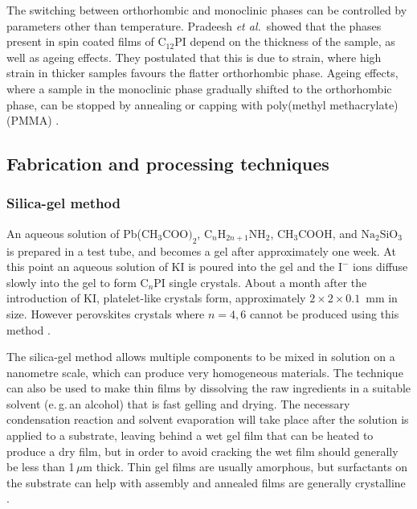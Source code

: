 The switching between orthorhombic and monoclinic phases can be controlled by parameters other than temperature. Pradeesh \textit{et al.}\ showed that the phases present in spin coated films of $\textrm{C}_{12}$PI depend on the thickness of the sample, as well as ageing effects. They postulated that this is due to strain, where high strain in thicker samples favours the flatter orthorhombic phase. Ageing effects, where a sample in the monoclinic phase gradually shifted to the orthorhombic phase, can be stopped by annealing or capping with poly(methyl methacrylate) (PMMA) \cite{Pradeesh2009}.

\subsection{Fabrication and processing techniques}
\subsubsection{Silica-gel method}
An aqueous solution of Pb($\textrm{CH}_3 \textrm{COO)}_2$, $\textrm{C}_n\textrm{H}_{2n+1}\textrm{NH}_2$, $\textrm{CH}_3$COOH, and $\textrm{Na}_2\textrm{SiO}_3$ is prepared in a test tube, and becomes a gel after approximately one week. At this point an aqueous solution of KI is poured into the gel and the $\textrm{I}^-$ ions diffuse slowly into the gel to form $\textrm{C}_n$PI single crystals. About a month after the introduction of KI, platelet-like crystals form, approximately $2\times 2\times 0.1$~mm in size. However perovskites crystals where $n=4,6$ cannot be produced using this method \cite{Ishihara1990}.

The silica-gel method allows multiple components to be mixed in solution on a nanometre scale, which can produce very homogeneous materials. The technique can also be used to make thin films by dissolving the raw ingredients in a suitable solvent (e.\,g.\,an alcohol) that is fast gelling and drying. The necessary condensation reaction and solvent evaporation will take place after the solution is applied to a substrate, leaving behind a wet gel film that can be heated to produce a dry film, but in order to avoid cracking the wet film should generally be less than 1\,$\mu$m thick. Thin gel films are usually amorphous, but surfactants on the substrate can help with assembly and annealed films are generally crystalline \cite{Mitzi2001b}.

